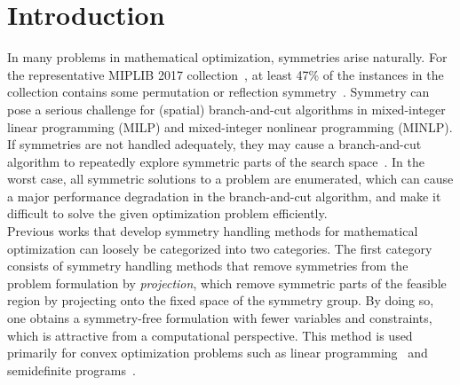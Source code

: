 \documentclass[pdflatex,sn-mathphys-num]{sn-jnl}%
\theoremstyle{thmstyleone}%
\theoremstyle{thmstylethree}%
\theoremstyle{thmstyletwo}%
\begin{document}
\section{Introduction}
In many problems in mathematical optimization,  symmetries arise naturally. For the representative MIPLIB 2017 collection~\cite{Gleixner2021}, at least 47\% of the instances in the collection contains some permutation or reflection symmetry~\cite{Hojny2025-si}.
Symmetry can pose a serious challenge for (spatial) branch-and-cut algorithms in mixed-integer linear programming (MILP) and mixed-integer nonlinear programming (MINLP). If symmetries are not handled adequately, they may cause a branch-and-cut algorithm to repeatedly explore symmetric parts of the search space~\cite{Margot2010}. In the worst case, all symmetric solutions to a problem are enumerated, which can cause a major performance degradation in the branch-and-cut algorithm, and make it difficult to solve the given optimization problem efficiently.\\

Previous works that develop symmetry handling methods for mathematical optimization can loosely be categorized into two categories. 
The first category consists of symmetry handling methods that remove symmetries from the problem formulation by \emph{projection}, which remove symmetric parts of the feasible region by projecting onto the fixed space of the symmetry group. By doing so, one obtains a symmetry-free formulation with fewer variables and constraints, which is attractive from a computational perspective. This method is used primarily for convex optimization problems such as linear programming~\cite{Bodi2013} and semidefinite programs~\cite{Gatermann2004}.\\
\end{document}
